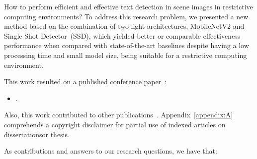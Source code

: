
\label{chap:conclusions}

 \nobibliography*

How to perform efficient and effective text detection in scene images in restrictive computing environments? 
To address this research problem, we presented a new method based on the combination of two light architectures, MobileNetV2 and Single Shot Detector~(SSD), which yielded better or comparable effectiveness performance when compared with state-of-the-art baselines despite having a low processing time and small model size, being suitable for a restrictive computing environment.

This work resulted on a published conference paper~\cite{decker}:
\begin{itemize}
    \item \textbf{}.
\end{itemize}

Also, this work contributed to other publications~\cite{joselito-paper,manuel,jhonny}. Appendix~\ref{appendix:A} comprehends a copyright disclaimer for partial use of indexed articles on dissertationsor thesis.


As contributions and answers to our research questions, we have that: 

